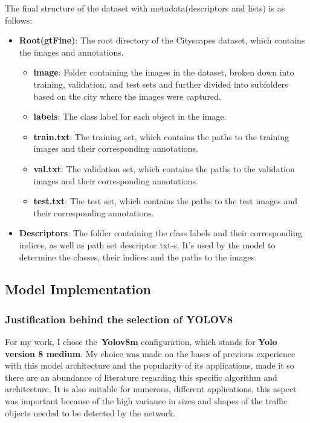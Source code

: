 The final structure of the dataset with metadata(descriptors and lists) is as follows:
\begin{itemize}
    \item \textbf{Root(gtFine)}: The root directory of the Cityscapes dataset, which contains the images and annotations.
    \begin{itemize}
        \item \textbf{image}: Folder containing the images in the dataset, broken down into training, validation, and test sets
    and further divided into subfolders based on the city where the images were captured.
        \item \textbf{labels}: The class label for each object in the image.
        \item \textbf{train.txt}: The training set, which contains the paths to the training images and their corresponding annotations.
        \item \textbf{val.txt}: The validation set, which contains the paths to the validation images and their corresponding annotations.
        \item \textbf{test.txt}: The test set, which contains the paths to the test images and their corresponding annotations.
    \end{itemize}
    \item \textbf{Descriptors}: The folder containing the class labels and their corresponding indices, as well as
    path set descriptor txt-s.
    It's used by the model to determine the classes, their indices and the paths to the images.
\end{itemize}


\subsection{Model Implementation}\label{subsec:model-implementation}


\subsubsection{Justification behind the selection of YOLOV8}\label{subsubsec:justification-behind-the-selection-of-yolov8}


For my work, I chose the~\textbf{Yolov8m} configuration, which stands for \textbf{Yolo version 8 medium}.
My choice was made on the bases of previous experience with this model architecture and the popularity of its applications, made it so there are an abundance of literature regarding this specific algorithm and architecture.
It is also suitable for numerous, different applications, this aspect was important because of the high variance in sizes and shapes of the traffic objects needed to be detected by the network.

